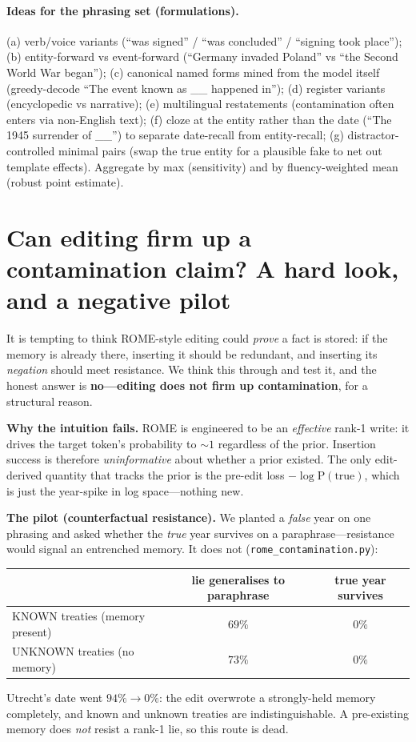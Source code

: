 \documentclass[11pt]{article}
\newcommand{\code}[1]{\texttt{\small #1}}
\begin{document}
\paragraph{Ideas for the phrasing set (formulations).} (a) verb/voice variants (``was signed'' / ``was concluded'' /
``signing took place''); (b) entity-forward vs event-forward (``Germany invaded Poland'' vs ``the Second World War
began''); (c) canonical named forms mined from the model itself (greedy-decode ``The event known as \_\_ happened in'');
(d) register variants (encyclopedic vs narrative); (e) multilingual restatements (contamination often enters via
non-English text); (f) cloze at the entity rather than the date (``The 1945 surrender of \_\_'') to separate
date-recall from entity-recall; (g) distractor-controlled minimal pairs (swap the true entity for a plausible fake to
net out template effects). Aggregate by max (sensitivity) and by fluency-weighted mean (robust point estimate).

\section{Can editing firm up a contamination claim? A hard look, and a negative pilot}\label{sec:rome}
It is tempting to think ROME-style editing could \emph{prove} a fact is stored: if the memory is already there, inserting
it should be redundant, and inserting its \emph{negation} should meet resistance. We think this through and test it, and
the honest answer is \textbf{no---editing does not firm up contamination}, for a structural reason.

\textbf{Why the intuition fails.} ROME is engineered to be an \emph{effective} rank-1 write: it drives the target token's
probability to $\sim\!1$ regardless of the prior. Insertion success is therefore \emph{uninformative} about whether a
prior existed. The only edit-derived quantity that tracks the prior is the pre-edit loss $-\log \mathrm{P}(\text{true})$,
which is just the year-spike in log space---nothing new.

\textbf{The pilot (counterfactual resistance).} We planted a \emph{false} year on one phrasing and asked whether the
\emph{true} year survives on a paraphrase---resistance would signal an entrenched memory. It does not
(\code{rome\_contamination.py}):
\begin{center}\small
\begin{tabular}{lcc}\toprule
 & lie generalises to paraphrase & true year survives\\\midrule
KNOWN treaties (memory present) & $69\%$ & $0\%$\\
UNKNOWN treaties (no memory)    & $73\%$ & $0\%$\\\bottomrule
\end{tabular}
\end{center}
Utrecht's date went $94\%\!\to\!0\%$: the edit overwrote a strongly-held memory completely, and known and unknown
treaties are indistinguishable. A pre-existing memory does \emph{not} resist a rank-1 lie, so this route is dead.
\end{document}
